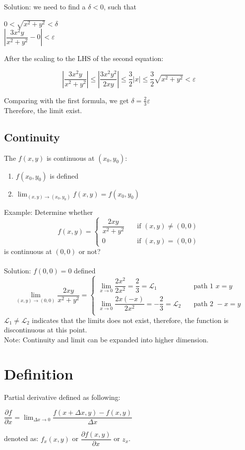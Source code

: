 \documentclass[UTF8,a4paper, 10pt, openany]{book}
\begin{document}
Solution: we need to find a $\delta <0$, such that
\begin{center}
$0<\sqrt{x^2+y^2}<\delta $\\
$\left|\dfrac{3x^2y }{x^2+y^2}-0\right|<\varepsilon$
\end{center}
After the scaling to the LHS of the second equation:

\[\left|	\dfrac{3x^2y }{x^2+y^2}	\right| \leq \left|\dfrac{3x^2y^2}{2xy}\right| \leq \dfrac{3}{2}|x| \leq \dfrac{3}{2}\sqrt{x^2+y^2}<\varepsilon \]

Comparing with the first formula, we get $\delta = \frac{2}{3}\varepsilon$\\
Therefore, the limit exist.
\subsection{Continuity}
The $f(x,y)$ is continuous at $(x_0,y_0)$:
\begin{enumerate}
\item $f(x_0,y_0)$ is defined
\item $\displaystyle\lim_{(x,y)\to (x_0,y_0)}f(x,y)=f(x_0,y_0)$
\end{enumerate}
Example: Determine whether\\
\[f(x,y)=\begin{cases}
\dfrac{2xy}{x^2+y^2} & \quad \text{if } (x,y)\neq (0,0)\\
0 & \quad \text{if } (x,y)= (0,0)
\end{cases}\]
is continuous at $(0,0)$ or not?\\ \\
Solution: $f(0,0)=0$ defined
\[\displaystyle\lim_{(x,y)\to (0,0)}\dfrac{2xy}{x^2+y^2}=\begin{cases}
\displaystyle\lim_{x\to 0}\dfrac{2x^2}{2x^2}=\dfrac{2}{3}=\mathcal{L}_1 & \quad \text{path 1 } x=y\\
\displaystyle\lim_{x\to 0}\dfrac{2x(-x)}{2x^2}=-\dfrac{2}{3}=\mathcal{L}_2 & \quad \text{path 2 } -x=y\\
\end{cases}\]
$\mathcal{L}_1\neq \mathcal{L}_2$ indicates that the limits does not exist, therefore, the function is discontinuous at this point.\\
Note: Continuity and limit can be expanded into higher dimension.

\section{Definition}
Partial derivative defined as following:
\begin{center}
$\dfrac{\partial f}{\partial x}=\displaystyle\lim_{\Delta x \to 0}\dfrac{f(x+\Delta x,y)-f(x,y)}{\Delta x}$
\end{center}
denoted as: $f_x(x,y)$ or $\dfrac{\partial f(x,y)}{\partial x}$ or $z_x$.
\end{document}
